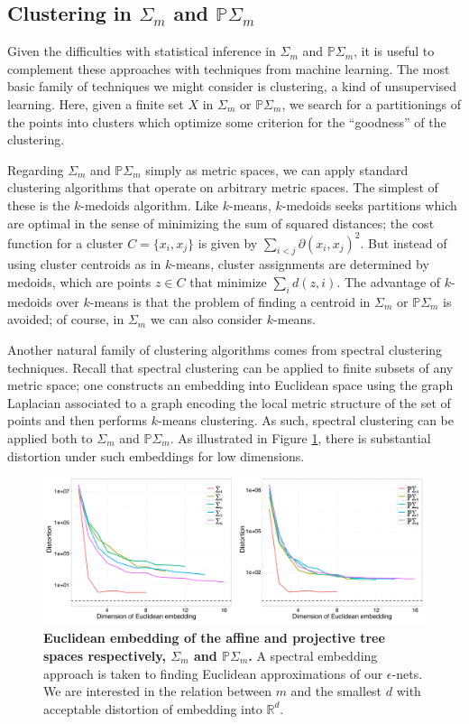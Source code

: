 \documentclass[a4paper,11pt]{article}
\begin{document}
\subsection{Clustering in $\Sigma_m$ and $\mathbb{P}\Sigma_m$}

Given the difficulties with statistical inference in $\Sigma_m$ and $\mathbb{P}\Sigma_m$, it is useful to complement these approaches with techniques from machine learning.
The most basic family of techniques we might consider is clustering, a kind of unsupervised learning.
Here, given a finite set $X$ in $\Sigma_m$ or $\mathbb{P}\Sigma_m$, we search for a partitionings of the points into clusters which optimize some criterion for the ``goodness'' of the clustering.

Regarding $\Sigma_m$ and $\mathbb{P}\Sigma_m$ simply as metric spaces, we can apply standard clustering algorithms that operate on arbitrary metric spaces.
The simplest of these is the $k$-medoids algorithm.
Like $k$-means, $k$-medoids seeks partitions which are optimal in the sense of minimizing the sum of squared distances; the cost function for a cluster $C = \{x_i, x_j\}$ is given by $\sum_{i < j} \partial(x_i,x_j)^2$.
But instead of using cluster centroids as in $k$-means, cluster assignments are determined by medoids, which are points $z \in C$ that minimize $\sum_i d(z,i)$.
The advantage of $k$-medoids over $k$-means is that the problem of finding a centroid in $\Sigma_m$ or $\mathbb{P}\Sigma_m$ is avoided; of course, in $\Sigma_m$ we can also consider $k$-means.

Another natural family of clustering algorithms comes from spectral clustering techniques.
Recall that spectral clustering can be applied to finite subsets of any metric space; one constructs an embedding into Euclidean space using the graph Laplacian associated to a graph encoding the local metric structure of the set of points and then performs $k$-means clustering.
As such, spectral clustering can be applied both to $\Sigma_m$ and $\mathbb{P}\Sigma_m$.
As illustrated in Figure \ref{fig:embedding}, there is substantial
distortion under such embeddings for low dimensions.

\begin{figure}
    \centering
    \includegraphics[width=\linewidth]{../figures/stats_embedding.pdf}
    \caption{{\bf Euclidean embedding of the affine and projective tree spaces respectively, $\Sigma_m$ and $\mathbb{P}\Sigma_m$.} A spectral embedding approach is taken to finding Euclidean approximations of our $\epsilon$-nets. We are interested in the relation between $m$ and the smallest $d$ with acceptable distortion of embedding into $\mathbb{R}^d$.}
    \label{fig:embedding}
\end{figure}
\end{document}
